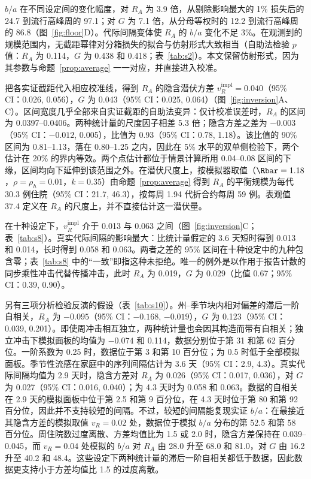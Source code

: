 $b/a$ 在不同设定间的变化幅度，对 $R_A$ 为 3.9 倍，从剔除影响最大的 1\% 损失后的 24.7 到流行高峰周的 97.1；对 $G$ 为 7.1 倍，从分母等权时的 12.2 到流行高峰周的 86.8（图~\ref{fig:floor}D）。代际间隔变体使 $R_A$ 的 $b/a$ 变化不足 3\%。在观测到的规模范围内，无截距幂律对分箱损失的拟合与仿射形式大致相当（自助法检验 $p$ 值：$R_A$ 为 0.114，$G$ 为 0.438 和 0.418；表~\ref{tab:s2}）。本文保留仿射形式，因为其参数与命题~\ref{prop:average} 一一对应，并直接进入校准。

把各实证截距代入相应校准线，得到 $R_A$ 的隐含潜伏方差 $v_R^{\mathrm{impl}}=0.040$（95\% CI：0.026, 0.056），$G$ 为 0.043（95\% CI：0.025, 0.064）（图~\ref{fig:inversion}A、C）。区间宽度几乎全部来自实证截距的自助法变异：仅计校准误差时，$R_A$ 的区间为 0.0397--0.0406。两种统计量的尺度因子相差 5.3 倍；隐含方差之差为 $-0.003$（95\% CI：$-0.012$, 0.005），比值为 0.93（95\% CI：0.78, 1.18）。该比值的 90\% 区间为 0.81--1.13，落在 0.80--1.25 之内，因此在 5\% 水平的双单侧检验下，两个估计在 20\% 的界内等效。两个点估计都位于情景计算所用 0.04--0.08 区间的下缘，区间均向下延伸到该范围之外。在潜伏尺度上，按模拟器取值（$\Rbar=1.18$，$\rho=\rho_h=0.01$，$k=0.35$）由命题~\ref{prop:average} 得到 $R_A$ 的平衡规模为每代 30.3 例住院（95\% CI：21.7, 46.3），按每周 1.94 代折合约每周 59 例。表观值 37.4 定义在 $R_A$ 的尺度上，并不直接估计这一潜伏量。

在十种设定下，$v_R^{\mathrm{impl}}$ 介于 0.013 与 0.063 之间（图~\ref{fig:inversion}C；表~\ref{tab:s8}）。真实代际间隔的影响最大：比统计量假定的 3.6 天短时得到 0.013 和 0.014，长时得到 0.058 和 0.063。两者之差的 95\% 区间在十种设定中的九种包含零；表~\ref{tab:s8} 中的“一致”即指这种未拒绝。唯一的例外是以作用于报告计数的同步乘性冲击代替传播冲击，此时 $R_A$ 为 0.019，$G$ 为 0.029（比值 0.67；95\% CI：0.39, 0.90）。

另有三项分析检验反演的假设（表~\ref{tab:s10}）。州--季节块内相对偏差的滞后一阶自相关，$R_A$ 为 $-0.095$（95\% CI：$-0.168$, $-0.019$），$G$ 为 0.123（95\% CI：0.039, 0.201）。即使周冲击相互独立，两种统计量也会因其构造而带有自相关；独立冲击下模拟面板的均值为 $-0.074$ 和 0.114，数据分别位于第 31 和第 62 百分位。一阶系数为 0.25 时，数据位于第 3 和第 10 百分位；为 0.5 时低于全部模拟面板。季节性流感在家庭中的序列间隔估计为 3.6 天（95\% CI：2.9, 4.3）\citep{cowling2009estimation}。真实代际间隔均值为 2.9 天时，隐含方差对 $R_A$ 为 0.026（95\% CI：0.017, 0.036），对 $G$ 为 0.027（95\% CI：0.016, 0.040）；为 4.3 天时为 0.058 和 0.063。数据的自相关在 2.9 天的模拟面板中位于第 2.5 和第 9 百分位，在 4.3 天时位于第 80 和第 92 百分位，因此并不支持较短的间隔。不过，较短的间隔能复现实证 $b/a$：在最接近其隐含方差的模拟取值 $v_R=0.02$ 处，数据位于模拟 $b/a$ 分布的第 52.5 和第 58 百分位。周住院数过度离散、方差均值比为 1.5 或 2.0 时，隐含方差保持在 0.039--0.045，而 $v_R=0.04$ 处模拟的 $b/a$ 对 $R_A$ 由 28.0 升至 68.0 和 81.0，对 $G$ 由 16.2 升至 40.2 和 48.4。这些设定下两种统计量的滞后一阶自相关都低于数据，因此数据更支持小于方差均值比 1.5 的过度离散。

